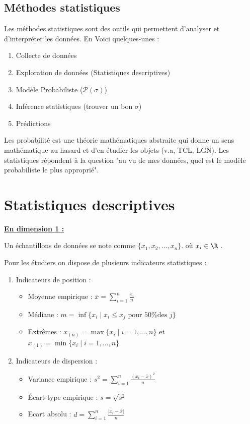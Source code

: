 \subsection{Méthodes statistiques}
Les méthodes statistiques sont des outils qui permettent d'analyser et d'interpréter les données. En Voici quelques-unes :
\begin{enumerate}[label=\arabic*.]
    \item Collecte de données
    \item Exploration de données (Statistiques descriptives)
    \item Modèle Probabiliste ($\mathcal{P}(\sigma)$)
    \item Inférence statistiques (trouver un bon $\sigma$)
    \item Prédictions
\end{enumerate}
Les probabilité est une théorie mathématiques abstraite qui donne un sens mathématique au hasard et d'en étudier les objets (v.a, TCL, LGN).
Les statistiques répondent à la question "au vu de mes données, quel est le modèle probabiliste le plus approprié".

\section{Statistiques descriptives}

\underline{\textbf{En dimension 1 : }}

Un échantillons de données se note comme $\{x_1, x_2, \ldots, x_n\}$. où $x_i\in \R$
.

Pour les étudiers on dispose de plusieurs indicateurs statistiques :
\begin{enumerate}[label=\arabic*.]
    \item Indicateurs de position :
    \begin{itemize}
    \item Moyenne empirique : $\bar{x}= \sum_{i=1}^n \frac{x_i}{n}$
    \item Médiane : $m=\operatorname{inf}\{x_i\mid x_i \leq x_j \text{ pour 50\% des }j\}$
    \item Extrêmes : $x_{(n)}=\max\{x_i\mid i=1,\ldots,n\}$ et $x_{(1)}=\min\{x_i\mid i=1,\ldots,n\}$
    \end{itemize}
    \item Indicateurs de dispersion :
    \begin{itemize}
        \item Variance empirique : $s^2=\sum_{i=1}^n \frac{(x_i-\bar{x})^2}{n}$
        \item Écart-type empirique : $s=\sqrt{s^2}$
        \item Ecart absolu : $d=\sum_{i=1}^n \frac{|x_i-\bar{x}|}{n}$
    \end{itemize}
\end{enumerate}

